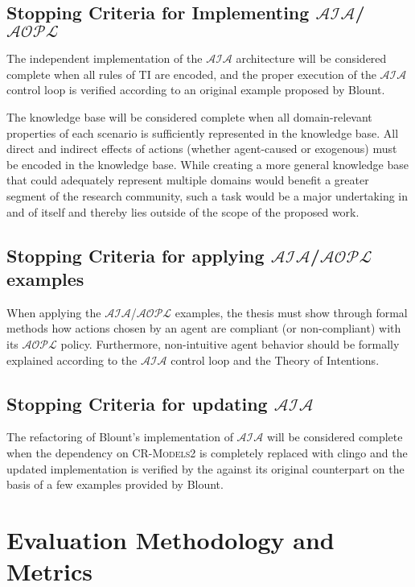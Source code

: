 \subsection{Stopping Criteria for Implementing $\mathcal{AIA}$/$\mathcal{AOPL}$}

The independent implementation of the $\mathcal{AIA}$ architecture will be considered complete when all rules of TI are encoded, and the proper execution of the $\mathcal{AIA}$ control loop is verified according to an original example proposed by Blount.

The knowledge base will be considered complete when all domain-relevant properties of each scenario is sufficiently represented in the knowledge base.
All direct and indirect effects of actions (whether agent-caused or exogenous) must be encoded in the knowledge base.
While creating a more general knowledge base that could adequately represent multiple domains would benefit a greater segment of the research community, such a task would be a major undertaking in and of itself and thereby lies outside of the scope of the proposed work.

\subsection{Stopping Criteria for applying $\mathcal{AIA}$/$\mathcal{AOPL}$ examples}

When applying the $\mathcal{AIA}$/$\mathcal{AOPL}$ examples, the thesis must show through formal methods how actions chosen by an agent are compliant (or non-compliant) with its $\mathcal{AOPL}$ policy.
Furthermore, non-intuitive agent behavior should be formally explained according to the $\mathcal{AIA}$ control loop and the Theory of Intentions.

\subsection{Stopping Criteria for updating $\mathcal{AIA}$}

The refactoring of Blount's implementation of $\mathcal{AIA}$ will be considered complete when the dependency on \textsc{CR-Models2} is completely replaced with clingo and the updated implementation is verified by the against its original counterpart on the basis of a few examples provided by Blount.

\section{Evaluation Methodology and Metrics}

